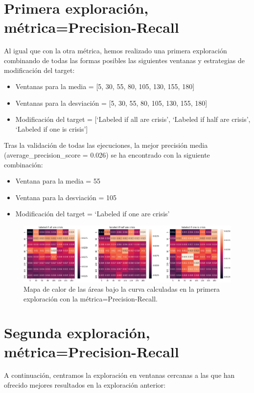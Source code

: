 \documentclass[a4paper,12pt,twoside,oldfontcommands]{memoir}
\begin{document}
\section{Primera exploración, métrica=Precision-Recall}

Al igual que con la otra métrica, hemos realizado una primera exploración combinando de todas las formas posibles las siguientes ventanas y estrategias de modificación del target: 
\begin{itemize}
    \item Ventanas para la media = [5, 30, 55, 80, 105, 130, 155, 180]
    \item Ventanas para la desviación = [5, 30, 55, 80, 105, 130, 155, 180]
    \item Modificación del target = [`Labeled if all are crisis', `Labeled if half are crisis', `Labeled if one is crisis']
\end{itemize}

Tras la validación de todas las ejecuciones, la mejor precisión media (average\_precision\_score = 0.026) se ha encontrado con la siguiente combinación: 
\begin{itemize}
    \item Ventana para la media = 55
    \item Ventana para la desviación = 105
    \item Modificación del target = `Labeled if one are crisis'
\end{itemize}

\begin{figure}
    \centering
    \includegraphics[width=1\textwidth]{images/heatmap4.png}
    \caption{Mapa de calor de las áreas bajo la curva calculadas en la primera exploración con la métrica=Precision-Recall.}
    \label{fig:heatmap4}
\end{figure}

\section{Segunda exploración, métrica=Precision-Recall}

A continuación, centramos la exploración en ventanas cercanas a las que han ofrecido mejores resultados en la exploración anterior:
\end{document}
